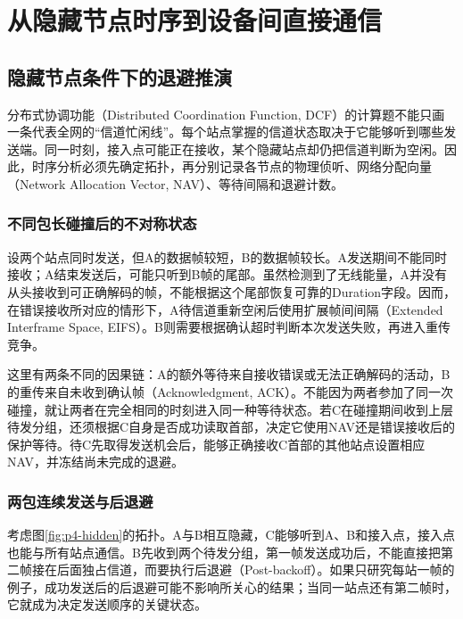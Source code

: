 \section{从隐藏节点时序到设备间直接通信}
\label{ch:d2d}

\subsection{隐藏节点条件下的退避推演}

分布式协调功能（Distributed Coordination Function, DCF）的计算题不能只画一条代表全网的“信道忙闲线”。每个站点掌握的信道状态取决于它能够听到哪些发送端。同一时刻，接入点可能正在接收，某个隐藏站点却仍把信道判断为空闲。因此，时序分析必须先确定拓扑，再分别记录各节点的物理侦听、网络分配向量（Network Allocation Vector, NAV）、等待间隔和退避计数。

\subsubsection{不同包长碰撞后的不对称状态}

设两个站点同时发送，但A的数据帧较短，B的数据帧较长。A发送期间不能同时接收；A结束发送后，可能只听到B帧的尾部。虽然检测到了无线能量，A并没有从头接收到可正确解码的帧，不能根据这个尾部恢复可靠的Duration字段。因而，在错误接收所对应的情形下，A待信道重新空闲后使用扩展帧间间隔（Extended Interframe Space, EIFS）。B则需要根据确认超时判断本次发送失败，再进入重传竞争。

这里有两条不同的因果链：A的额外等待来自接收错误或无法正确解码的活动，B的重传来自未收到确认帧（Acknowledgment, ACK）。不能因为两者参加了同一次碰撞，就让两者在完全相同的时刻进入同一种等待状态。若C在碰撞期间收到上层待发分组，还须根据C自身是否成功读取首部，决定它使用NAV还是错误接收后的保护等待。待C先取得发送机会后，能够正确接收C首部的其他站点设置相应NAV，并冻结尚未完成的退避。

\subsubsection{两包连续发送与后退避}

考虑图\ref{fig:p4-hidden}的拓扑。A与B相互隐藏，C能够听到A、B和接入点，接入点也能与所有站点通信。B先收到两个待发分组，第一帧发送成功后，不能直接把第二帧接在后面独占信道，而要执行后退避（Post-backoff）。如果只研究每站一帧的例子，成功发送后的后退避可能不影响所关心的结果；当同一站点还有第二帧时，它就成为决定发送顺序的关键状态。

